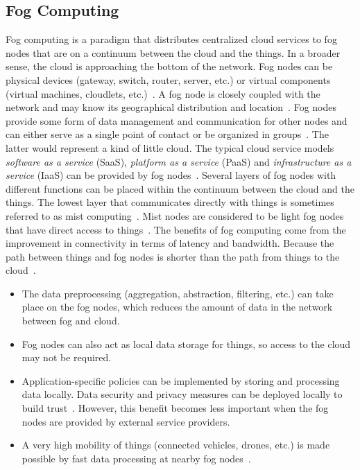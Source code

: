 \documentclass[english,version-2019-11]{uzl-thesis}
\begin{document}
\subsection{Fog Computing}
Fog computing is a paradigm that distributes
centralized cloud services to fog nodes that are on
a continuum between the cloud and the things. In a broader sense,
the cloud is approaching the bottom of the network.
Fog nodes can be physical devices
(gateway, switch, router, server, etc.) or virtual components
(virtual machines, cloudlets, etc.)~\cite{FogCompConc}. A fog node is closely
coupled with the network and may know its geographical
distribution and location~\cite{FogCompConc}.
Fog nodes provide some form of data management and communication
for other nodes and can either serve as
a single point of contact or be organized in groups~\cite{FogCompConc}.
The latter would represent a kind of little cloud.
The typical cloud service models \emph{software as a service} (SaaS), \emph{platform as a service} (PaaS) and \emph{infrastructure as a service} (IaaS) can
be provided by fog nodes~\cite{FogCompConc}. Several layers of fog nodes
with different functions can be placed within
the continuum between the cloud and the things.
The lowest layer that communicates directly with things
is sometimes referred to as mist computing~\cite{FogCompConc}.
Mist nodes are considered to be light fog nodes that have
direct access to things~\cite{FogCompConc}.
The benefits of fog computing come from the improvement
in connectivity in terms of latency and bandwidth.
Because the path between things and fog nodes is shorter than
the path from things to the cloud~\cite{DemystifyingFog}.
\begin{itemize}
\item  The data preprocessing (aggregation, abstraction, filtering, etc.)
can take place on the fog nodes, which reduces the amount of data
in the network between fog and cloud.
\item Fog nodes can also act as local data storage for things, so access to the cloud may not be required.
\item Application-specific policies can be implemented by storing
and processing data locally. Data security and privacy measures
can be deployed locally to build trust~\cite{DemystifyingFog}.
However, this benefit becomes less important when the fog nodes are provided
by external service providers.
\item A very high mobility of things (connected vehicles, drones, etc.)
is made possible by fast data processing at nearby fog nodes~\cite{DemystifyingFog}.
 \end{itemize}
\end{document}
